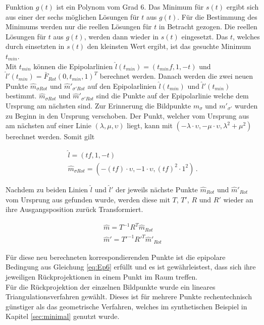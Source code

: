 Funktion $g(t)$ ist ein Polynom vom Grad 6. Das Minimum für $s(t)$ ergibt sich aus einer der sechs möglichen Lösungen für $t$ aus $g(t)$. Für die Bestimmung des Minimums werden nur die reellen Lösungen für $t$ in Betracht gezogen. Die reellen Lösungen für $t$ aus $g(t)$, werden dann wieder in $s(t)$ eingesetzt. Das $t$, welches durch einsetzten in $s(t)$ den kleinsten Wert ergibt, ist das gesuchte Minimum $t_{min}$. \\

Mit $t_{min}$ können die Epipolarlinien $\hat{l}(t_{min})=(t_{min}f,1,-t)$ und $\hat{l}'(t_{min}) = \bar{F}_{Rot}(0,t_{min},1)^T$ berechnet werden. Danach werden die zwei neuen Punkte $\hat{m}_{\sigma Rot}$ und $\hat{m}'_{\sigma' Rot}$ auf den Epipolarlinien $\hat{l}(t_{min})$ und $\hat{l}'(t_{min})$ bestimmt. $\hat{m}_{\sigma Rot}$ und $\hat{m}'_{\sigma' Rot}$ sind die Punkte auf der Epipolarlinie welche dem Ursprung am nächsten sind. Zur Erinnerung die Bildpunkte $m_\sigma$ und $m'_{\sigma'}$ wurden zu Beginn in den Ursprung verschoben. Der Punkt, welcher vom Ursprung aus am nächsten auf einer Linie $(\lambda, \mu,\upsilon)$ liegt, kann mit $(-\lambda \cdot \upsilon, -\mu \cdot \upsilon, \lambda^2+ \mu^2)$ berechnet werden\cite{HZ}. Somit gilt

\begin{gather}
	\hat{l} = (tf, 1, -t)\\
	\hat{m}_{\sigma Rot} = (-(tf) \cdot \upsilon , - 1 \cdot \upsilon, (tf)^2 \cdot 1^2 ) \, .
\end{gather}
 
Nachdem zu beiden Linien $\hat{l}$ und $\hat{l}'$ der jeweils nächste Punkte $\hat{m}_{Rot}$ und $\hat{m}'_{Rot}$ vom Ursprung aus gefunden wurde, werden diese mit $T$, $T'$, $R$ und $R'$ wieder an ihre Ausgangsposition zurück Transformiert. 

\begin{gather}
	\hat{m} = T^{-1}R^T\hat{m}_{Rot}\\
	\hat{m}' = T'^{-1}R'^T\hat{m}'_{Rot}
\end{gather}


Für diese neu berechneten korrespondierenden Punkte ist die epipolare Bedingung aus Gleichung \ref{eq:Ep6} erfüllt und es ist gewährleistest, dass sich ihre jeweiligen Rückprojektionen in einem Punkt im Raum treffen.\\

Für die Rückprojektion der einzelnen Bildpunkte wurde ein lineares Triangulationsverfahren gewählt\cite{HZ}. Dieses ist für mehrere Punkte rechentechnisch günstiger als das geometrische Verfahren, welches im synthetischen Beispiel in Kapitel \ref{sec:minimal} genutzt wurde.\\

